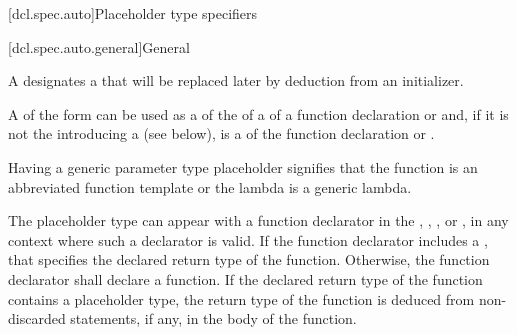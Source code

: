[dcl.spec.auto]{Placeholder type specifiers}%

[dcl.spec.auto.general]{General}%
%

\begin{bnf}
\br
   \br
    \terminal{(}  \terminal{)}
\end{bnf}

\pnum
A 
designates a  that will be replaced later by deduction
from an initializer.

\pnum
A  of the form
 
can be used as a  of
the  of
a  of
a function declaration or  and,
if it is not the  
introducing a  (see below),
is a 
of the function declaration or .
\begin{note}
Having a generic parameter type placeholder
signifies that the function is
an abbreviated function template or
the lambda is a generic lambda.
\end{note}

\pnum
The placeholder type can appear with a function declarator in the
, ,
, or ,
in any context where such a declarator is valid. If the function declarator
includes a , that
 specifies
the declared return type of the function. Otherwise, the function declarator
shall declare a function. If the declared return type of the
function contains a placeholder type, the return type of the function is
deduced from non-discarded  statements, if any, in the body
of the function.

